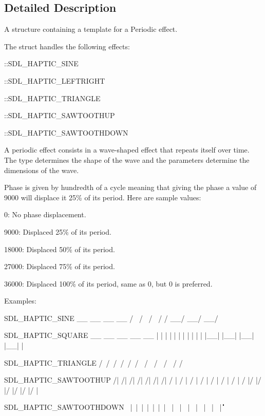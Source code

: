 \subsection{Detailed Description}
A structure containing a template for a Periodic effect. 

The struct handles the following effects\+:
\begin{DoxyItemize}
\item \+::\+S\+D\+L\+\_\+\+H\+A\+P\+T\+I\+C\+\_\+\+S\+I\+N\+E
\item \+::\+S\+D\+L\+\_\+\+H\+A\+P\+T\+I\+C\+\_\+\+L\+E\+F\+T\+R\+I\+G\+H\+T
\item \+::\+S\+D\+L\+\_\+\+H\+A\+P\+T\+I\+C\+\_\+\+T\+R\+I\+A\+N\+G\+L\+E
\item \+::\+S\+D\+L\+\_\+\+H\+A\+P\+T\+I\+C\+\_\+\+S\+A\+W\+T\+O\+O\+T\+H\+U\+P
\item \+::\+S\+D\+L\+\_\+\+H\+A\+P\+T\+I\+C\+\_\+\+S\+A\+W\+T\+O\+O\+T\+H\+D\+O\+W\+N
\end{DoxyItemize}

A periodic effect consists in a wave-\/shaped effect that repeats itself over time. The type determines the shape of the wave and the parameters determine the dimensions of the wave.

Phase is given by hundredth of a cycle meaning that giving the phase a value of 9000 will displace it 25\% of its period. Here are sample values\+:
\begin{DoxyItemize}
\item 0\+: No phase displacement.
\item 9000\+: Displaced 25\% of its period.
\item 18000\+: Displaced 50\% of its period.
\item 27000\+: Displaced 75\% of its period.
\item 36000\+: Displaced 100\% of its period, same as 0, but 0 is preferred.
\end{DoxyItemize}

Examples\+: \begin{DoxyVerb}SDL_HAPTIC_SINE
  __      __      __      __
 /  \    /  \    /  \    /
/    \__/    \__/    \__/

SDL_HAPTIC_SQUARE
 __    __    __    __    __
|  |  |  |  |  |  |  |  |  |
|  |__|  |__|  |__|  |__|  |

SDL_HAPTIC_TRIANGLE
  /\    /\    /\    /\    /\
 /  \  /  \  /  \  /  \  /
/    \/    \/    \/    \/

SDL_HAPTIC_SAWTOOTHUP
  /|  /|  /|  /|  /|  /|  /|
 / | / | / | / | / | / | / |
/  |/  |/  |/  |/  |/  |/  |

SDL_HAPTIC_SAWTOOTHDOWN
\  |\  |\  |\  |\  |\  |\  |
 \ | \ | \ | \ | \ | \ | \ |
  \|  \|  \|  \|  \|  \|  \|
\end{DoxyVerb}


